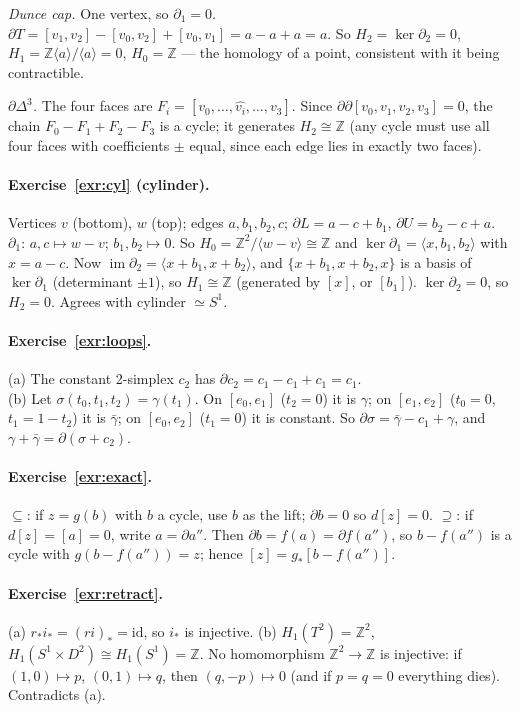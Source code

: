 \documentclass[11pt]{article}
\newcommand{\Z}{\mathbb Z}
\newcommand{\im}{\operatorname{im}}
\theoremstyle{definition}
\begin{document}
\emph{Dunce cap.} One vertex, so $\partial_1=0$. $\partial T=[v_1,v_2]-[v_0,v_2]+[v_0,v_1]=a-a+a=a$. So $H_2=\ker\partial_2=0$, $H_1=\Z\langle a\rangle/\langle a\rangle=0$, $H_0=\Z$ --- the homology of a point, consistent with it being contractible.

\emph{$\partial\Delta^3$.} The four faces are $F_i=[v_0,\dots,\widehat{v_i},\dots,v_3]$. Since $\partial\partial[v_0,v_1,v_2,v_3]=0$, the chain $F_0-F_1+F_2-F_3$ is a cycle; it generates $H_2\cong\Z$ (any cycle must use all four faces with coefficients $\pm$ equal, since each edge lies in exactly two faces).

\paragraph{Exercise~\ref{exr:cyl} (cylinder).}
Vertices $v$ (bottom), $w$ (top); edges $a,b_1,b_2,c$; $\partial L=a-c+b_1$, $\partial U=b_2-c+a$.
$\partial_1$: $a,c\mapsto w-v$; $b_1,b_2\mapsto0$. So $H_0=\Z^2/\langle w-v\rangle\cong\Z$ and $\ker\partial_1=\langle x,b_1,b_2\rangle$ with $x=a-c$. Now $\im\partial_2=\langle x+b_1,x+b_2\rangle$, and $\{x+b_1,x+b_2,x\}$ is a basis of $\ker\partial_1$ (determinant $\pm1$), so $H_1\cong\Z$ (generated by $[x]$, or $[b_1]$). $\ker\partial_2=0$, so $H_2=0$. Agrees with cylinder $\simeq S^1$.

\paragraph{Exercise~\ref{exr:loops}.}
(a) The constant 2-simplex $c_2$ has $\partial c_2=c_1-c_1+c_1=c_1$.\\
(b) Let $\sigma(t_0,t_1,t_2)=\gamma(t_1)$. On $[e_0,e_1]$ ($t_2=0$) it is $\gamma$; on $[e_1,e_2]$ ($t_0=0$, $t_1=1-t_2$) it is $\bar\gamma$; on $[e_0,e_2]$ ($t_1=0$) it is constant. So $\partial\sigma=\bar\gamma-c_1+\gamma$, and $\gamma+\bar\gamma=\partial(\sigma+c_2)$.

\paragraph{Exercise~\ref{exr:exact}.}
$\subseteq$: if $z=g(b)$ with $b$ a cycle, use $b$ as the lift; $\partial b=0$ so $d[z]=0$.
$\supseteq$: if $d[z]=[a]=0$, write $a=\partial a''$. Then $\partial b=f(a)=\partial f(a'')$, so $b-f(a'')$ is a cycle with $g(b-f(a''))=z$; hence $[z]=g_*[b-f(a'')]$.

\paragraph{Exercise~\ref{exr:retract}.}
(a) $r_*i_*=(ri)_*=\mathrm{id}$, so $i_*$ is injective.
(b) $H_1(T^2)=\Z^2$, $H_1(S^1\times D^2)\cong H_1(S^1)=\Z$. No homomorphism $\Z^2\to\Z$ is injective: if $(1,0)\mapsto p$, $(0,1)\mapsto q$, then $(q,-p)\mapsto0$ (and if $p=q=0$ everything dies). Contradicts (a).
\end{document}
